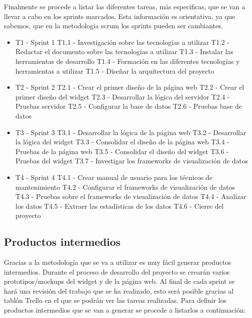 Finalmente se procede a listar las diferentes tareas, más especificas, que se van a llevar a cabo en los sprints marcados. Esta información es orientativa, ya que sabemos, que en la metodologia scrum los sprints pueden ser cambiantes.

\begin{itemize}
	\item T1 - Sprint 1
	\subitem T1.1 - Investigación sobre las tecnologías a utilizar
	\subitem T1.2 - Redactar el documento sobre las tecnologías a utilizar
	\subitem T1.3 - Instalar las herramientas de desarrollo
	\subitem T1.4 - Formación en las diferentes tecnologías y herramientas a utilizar
	\subitem T1.5 - Diseñar la arquitectura del proyecto
	\item T2 - Sprint 2
	\subitem T2.1 - Crear el primer diseño de la página web
	\subitem T2.2 - Crear el primer diseño del widget
	\subitem T2.3 -	Desarrollar la lógica del servidor
	\subitem T2.4 - Pruebas servidor
	\subitem T2.5 - Configurar la base de datos
	\subitem T2.6 - Pruebas base de datos
	\item T3 - Sprint 3
	\subitem T3.1 - Desarrollar la lógica de la página web
	\subitem T3.2 - Desarrollar la lógica del widget
	\subitem T3.3 - Consolidar el diseño de la página web
	\subitem T3.4 - Pruebas de la página web
	\subitem T3.5 - Consolidar el diseño del widget
	\subitem T3.6 - Pruebas del widget
	\subitem T3.7 - Investigar los frameworks de visualización de datos
	\item T4 - Sprint 4
	\subitem T4.1 - Crear manual de usuario para los técnicos de mantenimiento
	\subitem T4.2 - Configurar el frameworks de visualización de datos
	\subitem T4.3 - Pruebas sobre el frameworks de visualización de datos
	\subitem T4.4 - Analizar los datos
	\subitem T4.5 - Extraer las estadísticas de los datos
	\subitem T4.6 - Cierre del proyecto
\end{itemize}


\subsection{Productos intermedios}
Gracias a la metodología que se va a utilizar es muy fácil generar productos intermedios. Durante el proceso de desarrollo del proyecto se crearán varios prototipos/mockups del widget y de la página web. Al final de cada sprint se hará una revisión del trabajo que se ha realizado, esto será posible gracias al tablón Trello en el que se podrán ver las tareas realizadas. Para definir los productos intermedios que se van a generar se procede a listarlos a continuación:

